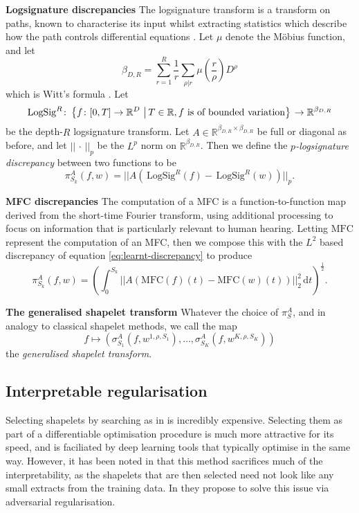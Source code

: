 \documentclass{article}
\theoremstyle{plain}
\theoremstyle{definition}
\newcommand{\set}[2]{\left\{#1\,\left\vert\,#2\vphantom{#1}\right\}\right.}
\newcommand{\reals}{\mathbb{R}}
\newcommand{\norm}[1]{\mathord|\!\mathord|#1\mathord|\!\mathord|} %
\newcommand{\dee}{\,\mathrm{d}}
\newcommand{\logsig}{\mathrm{LogSig}}
\newcommand{\mfc}{\mathrm{MFC}}
\newcommand{\boldheading}[1]{

\textbf{#1}\quad}
\begin{document}
	\boldheading{Logsignature discrepancies}
	The logsignature transform is a transform on paths, known to characterise its input whilst extracting statistics which describe how the path controls differential equations \cite{levy-lyons, deep-signatures, signatory, logsig-rnn}. Let $\mu$ denote the M{\"o}bius function, and let
	\begin{equation*}
	\beta_{D, R} = \sum_{r = 1}^R \frac{1}{r} \sum_{\rho \vert r} \mu\left(\frac{r}{\rho}\right) D^\rho
	\end{equation*}
	which is Witt's formula \cite{witt}. Let
	\begin{equation*}
	\logsig^R \colon \set{f \colon [0, T] \to \reals^D}{T \in \reals, f\text{ is of bounded variation}} \to \reals^{\beta_{D, R}}
	\end{equation*}
	be the depth-$R$ logsignature transform. Let $A \in \reals^{\beta_{D, R} \times \beta_{D, R}}$ be full or diagonal as before, and let $\norm{\,\cdot\,}_p$ be the $L^p$ norm on $\reals^{\beta_{D, R}}$. Then we define the \emph{$p$-logsignature discrepancy} between two functions to be
	\begin{equation}\label{eq:logsignature-discrepancy}
	\pi^A_{S_k}(f, w) = \norm{A(\,\logsig^R(f) - \,\logsig^R(w))}_p.
	\end{equation}
	
	\boldheading{MFC discrepancies}
	The computation of a MFC is a function-to-function map derived from the short-time Fourier transform, using additional processing to focus on information that is particularly relevant to human hearing. Letting $\mfc$ represent the computation of an MFC, then we compose this with the $L^2$ based discrepancy of equation \eqref{eq:learnt-discrepancy} to produce
	\begin{equation}\label{eq:mfc-discrepancy}
	\pi^A_{S_k}(f, w) = (\int_{0}^{S_k} \norm{A(\mfc(f)(t) - \mfc(w)(t))}_2^2 \dee t)^{\frac{1}{2}}.
	\end{equation}
	
	\boldheading{The generalised shapelet transform}
	Whatever the choice of $\pi^A_S$, and in analogy to classical shapelet methods, we call the map
	\begin{equation*}
	f \mapsto (\sigma^A_{S_1}(f, w^{1, \rho, S_1}), \ldots, \sigma^A_{S_K}(f, w^{K, \rho, S_K}))
	\end{equation*}
	the \emph{generalised shapelet transform}.
	
	\subsection{Interpretable regularisation}
	Selecting shapelets by searching as in \cite{TODO} is incredibly expensive. Selecting them as part of a differentiable optimisation procedure is much more attractive for its speed, and is faciliated by deep learning tools that typically optimise in the same way. However, it has been noted in \cite{TODO} that this method sacrifices much of the interpretability, as the shapelets that are then selected need not look like any small extracts from the training data. 
In \cite{TODO} they propose to solve this issue via adversarial regularisation.
\end{document}
